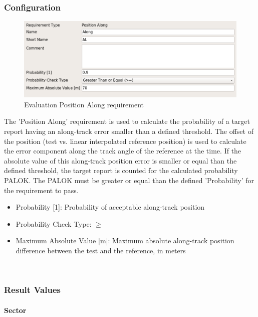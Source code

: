 \subsubsection{Configuration}

\begin{figure}[H]
    \includegraphics[width=14cm,frame]{../screenshots/eval_req_pos_along.png}
  \caption{Evaluation Position Along requirement}
\end{figure}

The 'Position Along' requirement is used to calculate the probability of a target report having an along-track error smaller than a defined threshold. The offset of the position (test vs. linear interpolated reference position) is used to calculate the error component along the track angle of the reference at the time. If the absolute value of this along-track position error is smaller or equal than the defined threshold, the target report is counted for the calculated probability PALOK. The PALOK must be greater or equal than the defined 'Probability' for the requirement to pass. \\

\begin{itemize}  
\item Probability [1]: Probability of acceptable along-track position
\item Probability Check Type: $\geq$
\item Maximum Absolute Value [m]: Maximum absolute along-track position difference between the test and the reference, in meters
\end{itemize}
\ \\

\subsubsection{Result Values}

\paragraph{Sector}

